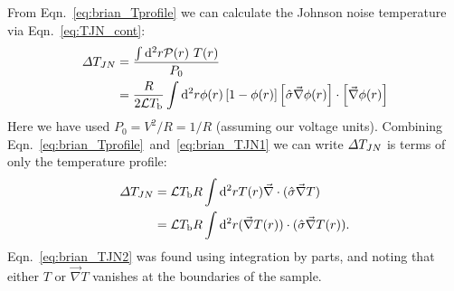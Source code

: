 From Eqn.~\ref{eq:brian_Tprofile} we can calculate the Johnson noise temperature via Eqn.~\ref{eq:TJN_cont}:
\begin{align}
\Delta T_{JN} &= \frac{\int\mathrm{d}^2r\mathcal{P}(r)~T(r)}{P_0} \nonumber \\
&= \frac{R}{2\mathcal{L} T_\mathrm{b}}\int\mathrm{d}^2r\phi(r)\left[1-\phi(r)\right]\left[\hat\sigma\vec\nabla\phi(r)\right]\cdot\left[\vec\nabla\phi(r)\right]\label{eq:brian_TJN1}
\end{align}
Here we have used $P_0 = V^2/R = 1/R$ (assuming our voltage units). Combining Eqn.~\ref{eq:brian_Tprofile}~and~\ref{eq:brian_TJN1} we can write $\Delta T_{JN}$ is terms of only the temperature profile:
\begin{align}
\Delta T_{JN} &= \mathcal{L} T_\mathrm{b}R\int\mathrm{d}^2rT(r)\vec\nabla\cdot(\hat\sigma\vec\nabla T) \nonumber \\
&= \mathcal{L} T_\mathrm{b}R\int\mathrm{d}^2r(\vec\nabla T(r))\cdot(\hat\sigma\vec\nabla T(r)).\label{eq:brian_TJN2}
\end{align}
Eqn.~\ref{eq:brian_TJN2} was found using integration by parts, and noting that either $T$ or $\vec\nabla T$ vanishes at the boundaries of the sample.

